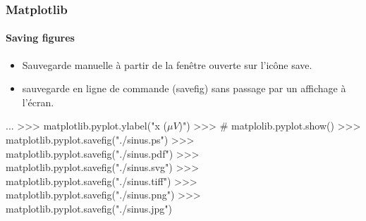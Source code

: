 \begin{frame}[fragile]
\frametitle{Matplotlib}
\framesubtitle{Saving figures}
\begin{itemize}
 \item Sauvegarde manuelle à partir de la fenêtre ouverte sur l'icône save.  
 \item sauvegarde en ligne de commande (savefig) sans passage par un affichage à l'écran.  
\end{itemize}
\begin{pythonConsole}
...
>>> matplotlib.pyplot.ylabel("x ($\mu V$)")
>>> # matplolib.pyplot.show()
>>> matplotlib.pyplot.savefig("./sinus.ps")
>>> matplotlib.pyplot.savefig("./sinus.pdf")
>>> matplotlib.pyplot.savefig("./sinus.svg")
>>> matplotlib.pyplot.savefig("./sinus.tiff")
>>> matplotlib.pyplot.savefig("./sinus.png")
>>> matplotlib.pyplot.savefig("./sinus.jpg")
\end{pythonConsole}
\end{frame}
